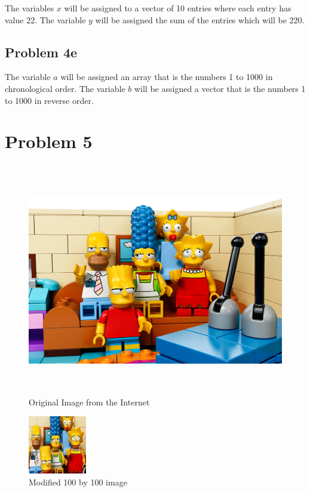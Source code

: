\documentclass[11pt,psfig]{article}
\begin{document}
The variables $x$ will be assigned to a vector of 10 entries where each entry has value 22. The variable $y$ will be assigned the sum of the entries which will be 220.

\subsection*{Problem 4e}

The variable $a$ will be assigned an array that is the numbers 1 to 1000 in chronological order. The variable $b$ will be assigned a vector that is the numbers 1 to 1000 in reverse order. 


\section*{Problem 5}

\begin{figure}[H]
\centering
\includegraphics[height=4in]{originalImageProb5.jpg}
\caption{Original Image from the Internet}
\end{figure}

\begin{figure}[H]
\centering
\includegraphics[height=1in]{modifiedImageProb5.jpg}
\caption{Modified 100 by 100 image}
\end{figure}
\end{document}
